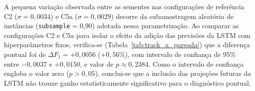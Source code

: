 \begin{table}[H]
\centering
\caption{Desempenho comparativo e teste de ablação da hipótese temporal no Track A (900 amostras de teste, 5 sementes).}
\label{tab:track_a_ablacao}
\end{table}

A pequena variação observada entre as sementes nas configurações de referência C2 ($\sigma = 0,0034$) e C5a ($\sigma = 0,0029$) decorre da subamostragem aleatória de instâncias (\texttt{subsample} = 0,90) adotada nessa parametrização. Ao comparar as configurações C2 e C5a para isolar o efeito da adição das previsões da LSTM com hiperparâmetros fixos, verifica-se (Tabela~\ref{tab:track_a_pareada}) que a diferença pontual foi de $\Delta F_1 = +0,0056$ ($+0,56\%$), com intervalo de confiança de 95\% entre $-0,0037$ e $+0,0150$, e valor de $p \approx 0,2384$. Como o intervalo de confiança engloba o valor zero ($p > 0,05$), conclui-se que a inclusão das projeções futuras da LSTM não trouxe ganho estatisticamente significativo para o diagnóstico pontual.

